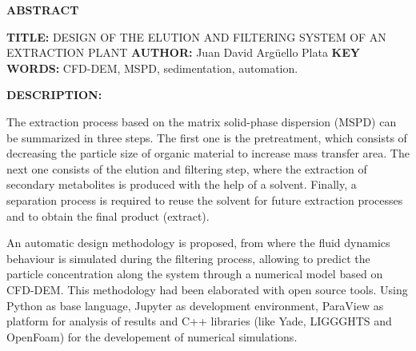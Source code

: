 \begin{center}
	\textbf{\textsc{{\Large ABSTRACT}}}\\
\end{center}

\noindent
\justify


\textbf{TITLE:} DESIGN OF THE ELUTION AND FILTERING SYSTEM OF AN EXTRACTION PLANT\footnotemark
\noindent
\justify
\textbf{AUTHOR:} Juan David Arg\"uello Plata\footnotemark
\noindent
\justify
\textbf{KEY WORDS:} CFD-DEM, MSPD, sedimentation, automation.


\noindent
\justify


\textbf{\large DESCRIPTION:} 

\noindent
\justify

The extraction process based on the matrix solid-phase dispersion (MSPD) can be summarized in three steps. The first one is the pretreatment, which consists of decreasing the particle size of organic material to increase mass transfer area. The next one consists of the elution and filtering step, where the extraction of secondary metabolites is produced with the help of a solvent. Finally, a separation process is required to reuse the solvent for future extraction processes and to obtain the final product (extract).

\noindent
\justify


An automatic design methodology is proposed, from where the fluid dynamics behaviour is simulated during the filtering process, allowing to predict the particle concentration along the system through a numerical model based on CFD-DEM. This methodology had been elaborated with open source tools. Using Python as base language, Jupyter as development environment, ParaView as platform for analysis of results and C++ libraries (like Yade, LIGGGHTS and OpenFoam) for the developement of numerical simulations.


